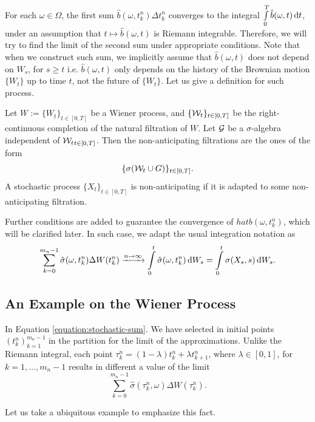 For each $\omega\in\Omega$, the first sum $\hat{b}(\omega, t_k^n)\Delta t^n_{k}$ converges to the integral $\int\limits_0^T \hat{b}(\omega, t)\,\mathrm{d} t$, under an assumption that $t\mapsto \hat{b}(\omega, t)$ is Riemann integrable. Therefore, we will try to find the limit of the second sum under appropriate conditions. Note that when we construct such sum, we implicitly assume that $\hat{b}(\omega, t)$ does not depend on $W_s$, for $s\ge t$ i.e. $\hat{b}(\omega, t)$ only depends on the history of the Brownian motion $\{W_t\}$ up to time $t$, not the future of $\{W_t\}$. Let us give a definition for such process.

\begin{definition}
  Let $W:=\{W_t\}_{t\in[0,T]}$ be a Wiener process, and $\{\mathcal{W}_t\}_{t\in[0,T]}$ be the right-continuous completion of the natural filtration of $W$. Let $\mathcal{G}$ be a $\sigma$-algebra independent of ${\mathcal{W}_t}_{t\in[0,T]}$. Then the non-anticipating filtrations are the ones of the form
  $$\{\sigma(\mathcal{W}_t \cup G)\}_{t\in[0,T]}.$$
  A stochastic process $\{X_t\}_{t\in[0,T]}$ is non-anticipating if it is adapted to some non-anticipating filtration.
\end{definition}

Further conditions are added to guarantee the convergence of $hat{b}(\omega, t_k^n)$, which will be clarified later. In such case, we adapt the usual integration notation as
\begin{equation}
  \sum\limits_{k=0}^{m_n-1} \hat{\sigma}(\omega, t_k^n)\Delta W(t^n_{k}) \xrightarrow{n\to\infty} \int\limits_0^t \hat{\sigma}(\omega, t_k^n)\,\mathrm{d} W_s = \int\limits_0^t \sigma(X_s,s)\,\mathrm{d} W_s.
\end{equation}

\subsection{An Example on the Wiener Process}

In Equation \ref{equation:stochastic-sum}. We have selected in initial points $(t_k^n)_{k=1}^{m_n-1}$ in the partition for the limit of the approximations. Unlike the Riemann integral, each point $\tau_k^n = (1-\lambda) t_k^n + \lambda t_{k+1}^n$, where $\lambda\in[0,1]$, for $k=1,\ldots, m_n-1$ results in different a value of the limit
$$\sum\limits_{k=0}^{m_n-1} \hat{\sigma}(\tau_k^n, \omega)\Delta W(\tau^n_{k}).$$

Let us take a ubiquitous example to emphasize this fact.

